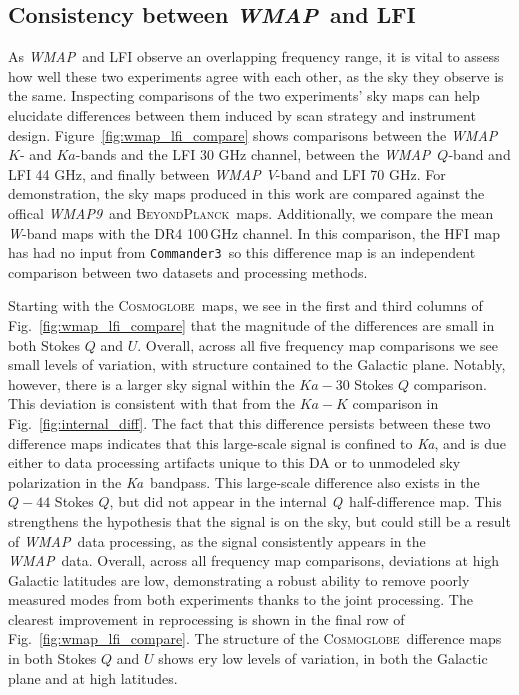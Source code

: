 \documentclass[twocolumn]{../../common/aa}
\def\WMAP{\emph{WMAP}}
\def\WMAPnine{\emph{WMAP9}}
\def\commanderthree{\texttt{Commander3}}
\newcommand{\BP}{\textsc{BeyondPlanck}}
\newcommand{\cosmoglobe}{\textsc{Cosmoglobe}}
\newcommand{\Ka}[0]{\textit{Ka}}
\newcommand{\Q}[0]{\textit Q}
\newcommand{\W}[0]{\textit W}
\begin{document}
\subsection{Consistency between \WMAP\ and LFI}
\label{sec:lfi_consistency}


As \WMAP\ and LFI observe an overlapping frequency range, it is vital to assess
how well these two experiments agree with each other, as the sky they observe
is the same. Inspecting comparisons of the two experiments' sky maps can help
elucidate differences between them induced by scan strategy and instrument
design. Figure~\ref{fig:wmap_lfi_compare} shows comparisons between the \WMAP\
$K$- and $Ka$-bands and the LFI 30 GHz channel, between the \WMAP\ $Q$-band and
LFI 44 GHz, and finally between \WMAP\ $V$-band and LFI 70 GHz. For
demonstration, the sky maps produced in this work are compared against the
offical \WMAPnine\ and \BP\ maps. Additionally, we compare the mean \W-band
maps with the DR4 100\,GHz channel. In this comparison, the HFI map has had no
input from \commanderthree\ so this difference map is an independent comparison
between two datasets and processing methods.

Starting with the \cosmoglobe\ maps, we see in the first and third columns of
Fig.~\ref{fig:wmap_lfi_compare} that the magnitude of the differences are small
in both Stokes $Q$ and $U$. Overall, across all five frequency map comparisons
we see small levels of variation, with structure contained to the Galactic
plane. Notably, however, there is a larger sky signal within the
$\mathit{Ka}-30$ Stokes $Q$ comparison.  This deviation is consistent with that
from the $\mathit{Ka}-\mathit{K}$ comparison in Fig.~\ref{fig:internal_diff}.
The fact that this difference persists between these two difference maps
indicates that this large-scale signal is confined to \Ka, and is due either to
data processing artifacts unique to this DA or to unmodeled sky polarization in
the \Ka\ bandpass. This large-scale difference also exists in the $\mathit
Q-44$ Stokes $Q$, but did not appear in the internal \Q\ half-difference map.
This strengthens the hypothesis that the signal is on the sky, but could still
be a result of \WMAP\ data processing, as the signal consistently appears in
the \WMAP\ data.  Overall, across all frequency map comparisons, deviations at
high Galactic latitudes are low, demonstrating a robust ability to remove
poorly measured modes from both experiments thanks to the joint processing. The
clearest improvement in reprocessing is shown in the final row of
Fig.~\ref{fig:wmap_lfi_compare}. The structure of the \cosmoglobe\ difference
maps in both Stokes $Q$ and $U$ shows ery low levels of variation, in both the
Galactic plane and at high latitudes. 
\end{document}
